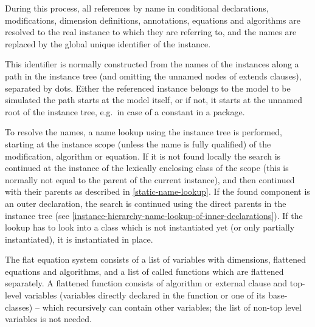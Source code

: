 During this process, all references by name in conditional declarations,
modifications, dimension definitions, annotations, equations and
algorithms are resolved to the real instance to which they are referring
to, and the names are replaced by the global unique identifier of the
instance.

\begin{nonnormative}
This identifier is normally constructed from the names of the instances along a path in the instance tree (and omitting the unnamed nodes of extends clauses), separated
by dots.  Either the referenced instance belongs to the model to be simulated the path starts at the model itself, or if not, it starts at the unnamed root of the instance
tree, e.g.\ in case of a constant in a package.
\end{nonnormative}

\begin{nonnormative}
To resolve the names, a name lookup using the instance tree is performed, starting at the instance scope (unless the name is fully qualified) of the modification, algorithm
or equation.  If it is not found locally the search is continued at the instance of the lexically enclosing class of the scope (this is normally not equal to the parent of
the current instance), and then continued with their parents as described in \cref{static-name-lookup}.  If the found component is an outer declaration, the search is
continued using the direct parents in the instance tree (see \cref{instance-hierarchy-name-lookup-of-inner-declarations}).  If the lookup has to look into a class which
is not instantiated yet (or only partially instantiated), it is instantiated in place.
\end{nonnormative}

The flat equation system consists of a list of variables with
dimensions, flattened equations and algorithms, and a list of called
functions which are flattened separately. A flattened function consists
of algorithm or external clause and top-level variables (variables
directly declared in the function or one of its base-classes) -- which
recursively can contain other variables; the list of non-top level
variables is not needed.

